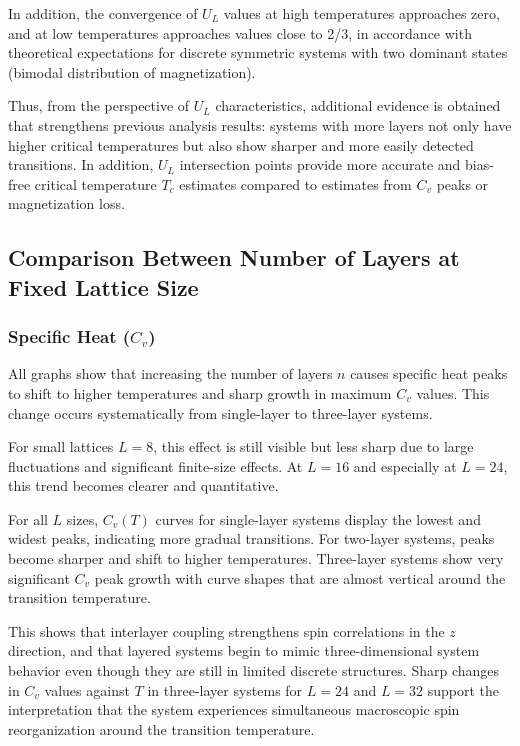 In addition, the convergence of $U_L$ values at high temperatures approaches zero, and at low temperatures approaches values close to 2/3, in accordance with theoretical expectations for discrete symmetric systems with two dominant states (bimodal distribution of magnetization).

Thus, from the perspective of $U_L$ characteristics, additional evidence is obtained that strengthens previous analysis results: systems with more layers not only have higher critical temperatures but also show sharper and more easily detected transitions. In addition, $U_L$ intersection points provide more accurate and bias-free critical temperature $T_c$ estimates compared to estimates from $C_v$ peaks or magnetization loss.

\subsection{Comparison Between Number of Layers at Fixed Lattice Size}

\subsubsection{Specific Heat ($C_v$)}

All graphs show that increasing the number of layers $n$ causes specific heat peaks to shift to higher temperatures and sharp growth in maximum $C_v$ values. This change occurs systematically from single-layer to three-layer systems.

For small lattices $L = 8$, this effect is still visible but less sharp due to large fluctuations and significant finite-size effects. At $L = 16$ and especially at $L = 24$, this trend becomes clearer and quantitative.

For all $L$ sizes, $C_v(T)$ curves for single-layer systems display the lowest and widest peaks, indicating more gradual transitions. For two-layer systems, peaks become sharper and shift to higher temperatures. Three-layer systems show very significant $C_v$ peak growth with curve shapes that are almost vertical around the transition temperature.

This shows that interlayer coupling strengthens spin correlations in the $z$ direction, and that layered systems begin to mimic three-dimensional system behavior even though they are still in limited discrete structures. Sharp changes in $C_v$ values against $T$ in three-layer systems for $L = 24$ and $L = 32$ support the interpretation that the system experiences simultaneous macroscopic spin reorganization around the transition temperature.

